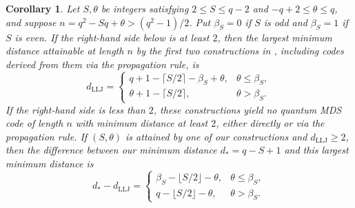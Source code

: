 \documentclass[preprint,12pt,a4paper]{elsarticle}
\newtheorem{corollary}[theorem]{Corollary}
\begin{document}
\begin{corollary}\label{cor:llj-comparison}
Let $S,\theta$ be integers satisfying $2\le S\le q-2$ and $-q+2\le\theta\le q$, and suppose $n=q^2-Sq+\theta>(q^2-1)/2$. Put $\beta_S=0$ if $S$ is odd and $\beta_S=1$ if $S$ is even. If the right-hand side below is at least $2$, then the largest minimum distance attainable at length $n$ by the first two constructions in \cite{LiLiuJiang2026}, including codes derived from them via the propagation rule, is
\begin{equation}\label{eq:llj-band}
 d_{\mathrm{LLJ}}=
 \begin{cases}
 q+1-\lceil S/2\rceil-\beta_S+\theta,&\theta\le\beta_S,\\
 \theta+1-\lceil S/2\rceil,&\theta>\beta_S.
 \end{cases}
\end{equation}
If the right-hand side is less than $2$, these constructions yield no quantum MDS code of length $n$ with minimum distance at least $2$, either directly or via the propagation rule. If $(S,\theta)$ is attained by one of our constructions and $d_{\mathrm{LLJ}}\ge2$, then the difference between our minimum distance $d_*=q-S+1$ and this largest minimum distance is
\begin{equation}\label{eq:general-llj-gain}
 d_*-d_{\mathrm{LLJ}}=
 \begin{cases}
 \beta_S-\lfloor S/2\rfloor-\theta,&\theta\le\beta_S,\\
 q-\lfloor S/2\rfloor-\theta,&\theta>\beta_S.
 \end{cases}
\end{equation}
\end{corollary}
\end{document}
